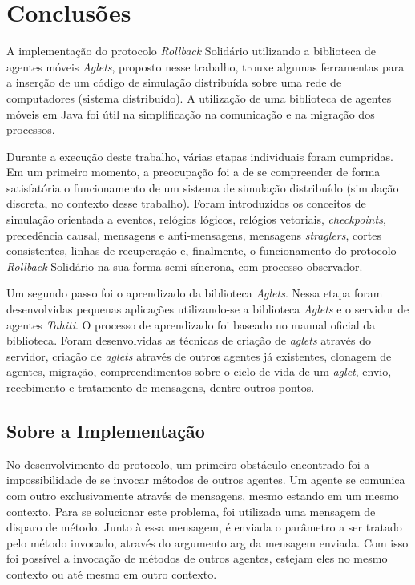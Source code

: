 \chapter{Conclusões}
A implementação do protocolo \textit{Rollback} Solidário utilizando a biblioteca de agentes móveis \textit{Aglets}, proposto nesse trabalho, trouxe algumas ferramentas para a inserção de um código de simulação distribuída sobre uma rede de computadores (sistema distribuído). A utilização de uma biblioteca de agentes móveis em Java foi útil na simplificação na comunicação e na migração dos processos. 

Durante a execução deste trabalho, várias etapas individuais foram cumpridas. Em um primeiro momento, a preocupação foi a de se compreender de forma satisfatória o funcionamento de um sistema de simulação distribuído (simulação discreta, no contexto desse trabalho). Foram introduzidos os conceitos de simulação orientada a eventos, relógios lógicos, relógios vetoriais, \textit{checkpoints}, precedência causal, mensagens e anti-mensagens, mensagens \textit{straglers}, cortes consistentes, linhas de recuperação e, finalmente, o funcionamento do protocolo \textit{Rollback} Solidário na sua forma semi-síncrona, com processo observador.

Um segundo passo foi o aprendizado da biblioteca \textit{Aglets}. Nessa etapa foram desenvolvidas pequenas aplicações utilizando-se a biblioteca \textit{Aglets} e o servidor de agentes \textit{Tahiti}. O processo de aprendizado foi baseado no manual oficial da biblioteca\cite{ManualAglets}. Foram desenvolvidas as técnicas de criação de \textit{aglets} através do servidor, criação de \textit{aglets} através de outros agentes já existentes, clonagem de agentes, migração, compreendimentos sobre o ciclo de vida de um \textit{aglet}, envio, recebimento e tratamento de mensagens, dentre outros pontos.

\section{Sobre a Implementação}
No desenvolvimento do protocolo, um primeiro obstáculo encontrado foi a impossibilidade de se invocar métodos de outros agentes. Um agente se comunica com outro exclusivamente através de mensagens, mesmo estando em um mesmo contexto. Para se solucionar este problema, foi utilizada uma mensagem de disparo de método. Junto à essa mensagem, é enviada o parâmetro a ser tratado pelo método invocado, através do argumento arg da mensagem enviada. Com isso foi possível a invocação de métodos de outros agentes, estejam eles no mesmo contexto ou até mesmo em outro contexto. 

